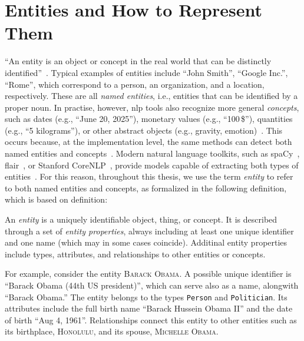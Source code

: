 \section{Entities and How to Represent Them}

``An entity is an object or concept in the real world that can be distinctly identified''~\cite{entityorientedsearch2018balog}.
Typical examples of entities include ``John Smith'', ``Google Inc.'', ``Rome'', which correspond to a person, an organization, and a location, respectively. These are all \emph{named entities}, i.e., entities that can be identified by a proper noun.
In practise, however, \acl{nlp} tools also recognize more general \emph{concepts}, such as dates (e.g., ``June 20, 2025''), monetary values (e.g., ``100\,\$''), quantities (e.g., ``5 kilograms''), or other abstract objects (e.g., gravity, emotion)~\cite{muc6_overview_1995}.
This occurs because, at the implementation level, the same methods can detect both named entities and concepts~\cite{entityorientedsearch2018balog}. Modern natural language toolkits, such as spaCy~\cite{honnibal2020spacy}, flair~\cite{akbik2019flair}, or Stanford CoreNLP~\cite{manning-EtAl:2014:P14-5}, provide models capable of extracting both types of entities~\cite{spacy-ner-labels,flair-ner-ontonotes,stanfordnlp-ner}. For this reason, throughout this thesis, we use the term \emph{entity} to refer to both named entities and concepts, as formalized in the following definition, which is based on \textcite{entityorientedsearch2018balog} definition:
\begin{definition}[Entity]
An \emph{entity} is a uniquely identifiable object, thing, or concept. 
It is described through a set of \emph{entity properties}, always including 
at least one unique identifier and one name (which may in some cases coincide). 
Additinal entity properties include types, attributes, and 
relationships to other entities or concepts.
\end{definition}

For example, consider the entity \textsc{Barack Obama}. 
A possible unique identifier is ``Barack Obama (44th US president)'', which can serve also as a name, alongwith ``Barack Obama.'' 
The entity belongs to the types \texttt{Person} and \texttt{Politician}. 
Its attributes include the full birth name ``Barack Hussein Obama II'' and the date of birth ``Aug 4, 1961''. 
Relationships connect this entity to other entities such as its birthplace, \textsc{Honolulu}, and its spouse, \textsc{Michelle Obama}.

